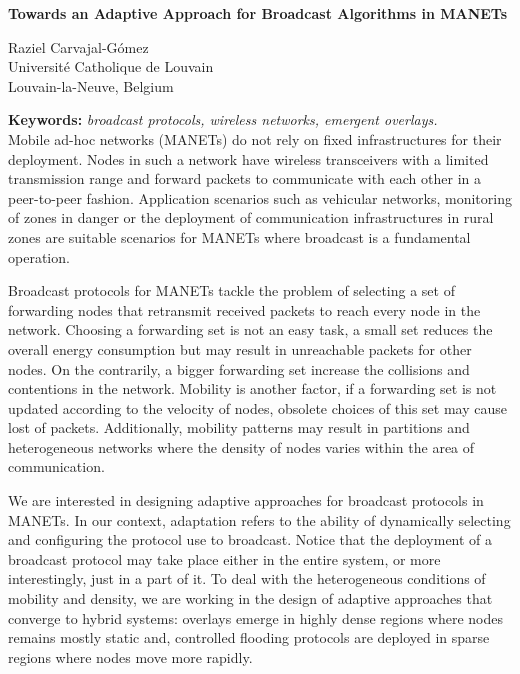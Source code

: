 \documentclass[11pt,twoside]{article}
\begin{document}
\vspace{0.2cm}

\begin{center}
{\Large\bf Towards an Adaptive Approach for Broadcast Algorithms in MANETs}
\end{center}

\begin{center}
{\large Raziel Carvajal-G{\'o}mez}\\
Universit{\'e} Catholique de Louvain\\
Louvain-la-Neuve, Belgium\\ 
\end{center}

\date{}

{\bf Keywords:} \emph{broadcast protocols, wireless networks, emergent overlays.}\\

Mobile ad-hoc networks (MANETs) do not rely on fixed infrastructures for their deployment.
%
Nodes in such a network have wireless transceivers with a limited transmission range and forward packets to communicate with each other in a peer-to-peer fashion.
%
Application scenarios such as vehicular networks, monitoring of zones in danger or the deployment of communication infrastructures in rural zones are suitable scenarios for MANETs where broadcast is a fundamental operation.
%
%

Broadcast protocols for MANETs tackle the problem of selecting a set of forwarding nodes that retransmit received packets to reach every node in the network.
%
Choosing a forwarding set is not an easy task, a small set reduces the overall energy consumption but may result in unreachable packets for other nodes.
%
On the contrarily, a bigger forwarding set increase the collisions and contentions in the network.
%
Mobility is another factor, if a forwarding set is not updated according to the velocity of nodes, obsolete choices of this set may cause lost of packets.
%
Additionally, mobility patterns may result in partitions and heterogeneous networks where the density of nodes varies within the area of communication.

We are interested in designing adaptive approaches for broadcast protocols in MANETs.
%
In our context, adaptation refers to the ability of dynamically selecting and configuring the protocol use to broadcast.
%
Notice that the deployment of a broadcast protocol may take place either in the entire system, or more interestingly, just in a part of it.
%
To deal with the heterogeneous conditions of mobility and density, we are working in the design of adaptive approaches that converge to hybrid systems: overlays emerge in highly dense regions where nodes remains mostly static and, controlled flooding protocols are deployed in sparse regions where nodes move more rapidly.
\end{document}

